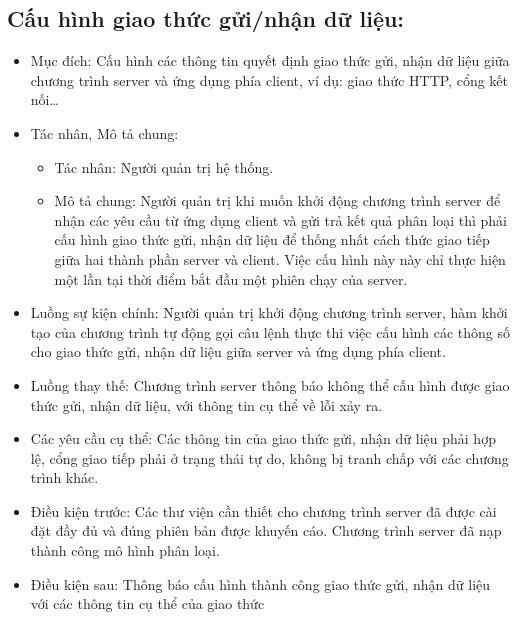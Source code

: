 \subsection{Cấu hình giao thức gửi/nhận dữ liệu:}
\begin{itemize}
	\item Mục đích: Cấu hình các thông tin quyết định giao thức gửi, nhận dữ liệu giữa chương trình server và ứng dụng phía client, ví dụ: giao thức HTTP, cổng kết	nối…
	\item Tác nhân, Mô tả chung:
	\begin{itemize}
		\item Tác nhân: Người quản trị hệ thống.
		\item Mô tả chung: Người quản trị khi muốn khởi động chương trình server để nhận các yêu cầu từ ứng dụng client và gửi trả kết quả phân loại	thì phải cấu hình giao thức gửi, nhận dữ liệu để thống nhất cách thức giao tiếp giữa hai thành phần server và client. Việc cấu hình này này	chỉ thực hiện một lần tại thời điểm bắt đầu một phiên chạy của server.
	\end{itemize}	
	\item Luồng sự kiện chính: Người quản trị khởi động chương trình server, hàm khởi tạo của chương trình tự động gọi câu lệnh thực thi việc cấu hình các thông số cho giao thức gửi, nhận dữ liệu giữa server và ứng dụng phía client.
	\item Luồng thay thế: Chương trình server thông báo không thể cấu hình được giao thức gửi, nhận dữ liệu, với thông tin cụ thể về lỗi xảy ra.
	\item Các yêu cầu cụ thể: Các thông tin của giao thức gửi, nhận dữ liệu phải hợp lệ, cổng giao tiếp phải ở trạng thái tự do, không bị tranh chấp với các chương	trình khác.
	\item Điều kiện trước: Các thư viện cần thiết cho chương trình server đã được cài đặt đầy đủ và đúng phiên bản được khuyến cáo. Chương trình server đã nạp thành công mô hình phân loại.
	\item Điều kiện sau: Thông báo cấu hình thành công giao thức gửi, nhận dữ liệu với các thông tin cụ thể của giao thức
\end{itemize}

